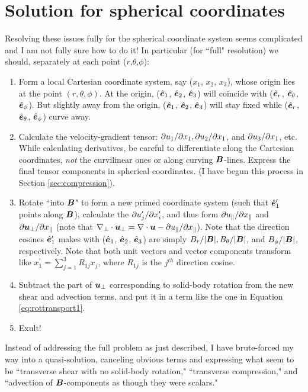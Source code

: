 \documentclass[12pt]{article}
\newcommand{\xpar}{x_\parallel}
\newcommand{\upar}{u_\parallel}
\newcommand{\uperp}{\vecu_\perp}
\begin{document}
\section{Solution for spherical coordinates}
Resolving these issues fully for the spherical coordinate system seems complicated and I am not fully sure how to do it! In particular (for ``full" resolution) we should, separately at each point ($r$,$\theta$,$\phi$):
\begin{enumerate}
	\item Form a local Cartesian coordinate system, say ($x_1$, $x_2$, $x_3$), whose origin lies at the point $(r,\theta,\phi)$. At the origin, ($\hat{\bm{e}}_1$, $\hat{\bm{e}}_2$, $\hat{\bm{e}}_3$) will coincide with ($\hat{\bm{e}}_r$, $\hat{\bm{e}}_\theta$, $\hat{\bm{e}}_\phi$). But slightly away from the origin, ($\hat{\bm{e}}_1$, $\hat{\bm{e}}_2$, $\hat{\bm{e}}_3$) will stay fixed while ($\hat{\bm{e}}_r$, $\hat{\bm{e}}_\theta$, $\hat{\bm{e}}_\phi$) curve away. 
	\item Calculate the velocity-gradient tensor: $\partial u_1/\partial x_1,\partial u_2/\partial x_1$, and $\partial u_3/\partial x_1$, etc. While calculating derivatives, be careful to differentiate along the Cartesian coordinates, \textit{not} the curvilinear ones or along curving $\bm{B}$-lines. Express the final tensor components in spherical coordinates. (I have begun this process in Section \ref{sec:compression}). 
	\item Rotate ``into $\bm{B}$" to form a new primed coordinate system (such that $\hat{\bm{e}}_1^\prime$ points along $\bm{B}$), calculate the $\partial u_j^\prime/\partial x_i^\prime$, and thus form $\pderivline{\upar}{\xpar}$ and $\pderivline{\uperp}{\xpar}$ (note that $\nabla_\perp\cdot\uperp=\Div\vecu- \pderivline{\upar}{\xpar}$). Note that the direction cosines $\hat{\bm{e}}_1^\prime$ makes with ($\hat{\bm{e}}_1$, $\hat{\bm{e}}_2$, $\hat{\bm{e}}_3$) are simply $B_r/|\bm{B}|,B_\theta/|\bm{B}|$, and $B_\phi/|\bm{B}|$, respectively. Note that both unit vectors and vector components transform like $x_1^\prime=\sum_{j=1}^3R_{1j}x_j$, where $R_{1j}$ is the $j^{th}$ direction cosine.  
	\item Subtract the part of $\uperp$ corresponding to solid-body rotation from the new shear and advection terms, and put it in a term like the one in Equation \eqref{eq:rottransport1}. 
	\item Exult!
\end{enumerate}
Instead of addressing the full problem as just described, I have brute-forced my way into a quasi-solution, canceling obvious terms and expressing what seem to be ``transverse shear with no solid-body rotation," ``transverse compression," and ``advection of $\bm{B}$-components as though they were scalars."  
\end{document}
